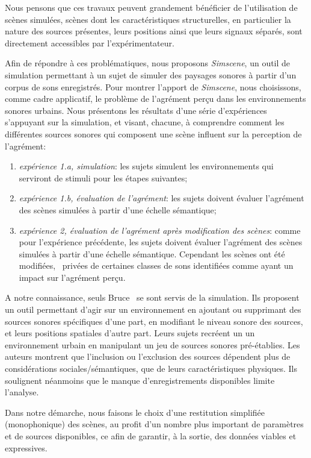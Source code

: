 \documentclass[twoside,twocolumn]{article}
\begin{document}
Nous pensons que ces travaux peuvent grandement bénéficier de l'utilisation de scènes simulées, scènes dont les caractéristiques structurelles, en particulier la nature des sources présentes, leurs positions ainsi que leurs signaux séparés, sont directement accessibles par l'expérimentateur.

Afin de répondre à ces problématiques, nous proposons \emph{Simscene}, un outil de simulation permettant à un sujet de simuler des paysages sonores à partir d'un corpus de sons enregistrés. Pour montrer l'apport de \emph{Simscene}, nous choisissons, comme cadre applicatif, le problème de l'agrément perçu dans les environnements sonores urbains. Nous présentons les résultats d'une série d'expériences s'appuyant sur la simulation, et visant, chacune, à comprendre comment les différentes sources sonores qui composent une scène influent sur la perception de l'agrément:

\begin{enumerate}
\item \emph{expérience 1.a, simulation}:  les sujets simulent les environnements qui serviront de stimuli pour les étapes suivantes;
\item \emph{expérience 1.b, évaluation de l'agrément}: les sujets doivent évaluer l'agrément des scènes simulées à partir d'une échelle sémantique;
\item \emph{expérience 2, évaluation de l'agrément après modification des scènes}: comme pour l'expérience précédente, les sujets doivent évaluer l'agrément des scènes simulées à partir d'une échelle sémantique. Cependant les scènes ont été modifiées, \ie~privées de certaines classes de sons identifiées comme ayant un impact sur l'agrément perçu.
\end{enumerate}

A notre connaissance, seuls Bruce~\al \cite{bruce2009development,bruce2014effects} se sont servis de la simulation. Ils proposent un outil permettant d'agir sur un environnement en ajoutant ou supprimant des sources sonores spécifiques d'une part, en modifiant le niveau sonore des sources, et leurs positions spatiales d'autre part. Leurs sujets recréent un un environnement urbain en manipulant un jeu de sources sonores pré-établies. Les auteurs montrent que l'inclusion ou l'exclusion des sources dépendent plus de considérations sociales/sémantiques, que de leurs caractéristiques physiques. Ils soulignent néanmoins que le manque d'enregistrements disponibles limite l'analyse.

Dans notre démarche, nous faisons le choix d'une restitution simplifiée (monophonique) des scènes, au profit d'un nombre plus important de paramètres et de sources disponibles, ce afin de garantir, à la sortie, des données viables et expressives.
\end{document}

